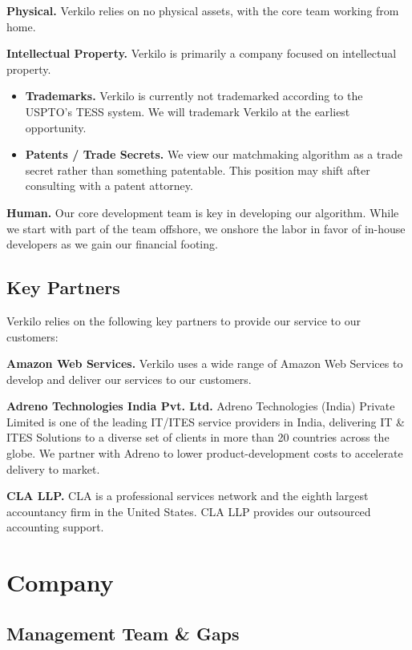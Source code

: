 \documentclass[11pt,openany]{book}
\providecommand{\tightlist}{%
  \setlength{\itemsep}{0pt}\setlength{\parskip}{0pt}}
\begin{document}
\textbf{Physical.} Verkilo relies on no physical assets, with the core
team working from home.

\textbf{Intellectual Property.} Verkilo is primarily a company focused
on intellectual property.

\begin{itemize}
\tightlist
\item
  \textbf{Trademarks.} Verkilo is currently not trademarked according to
  the USPTO's TESS system. We will trademark Verkilo at the earliest
  opportunity.
\item
  \textbf{Patents / Trade Secrets.} We view our matchmaking algorithm as
  a trade secret rather than something patentable. This position may
  shift after consulting with a patent attorney.
\end{itemize}

\textbf{Human.} Our core development team is key in developing our
algorithm. While we start with part of the team offshore, we onshore the
labor in favor of in-house developers as we gain our financial footing.

\hypertarget{key-partners}{%
\section{Key Partners}\label{key-partners}}

Verkilo relies on the following key partners to provide our service to
our customers:

\textbf{Amazon Web Services.} Verkilo uses a wide range of Amazon Web
Services to develop and deliver our services to our customers.

\textbf{Adreno Technologies India Pvt. Ltd.} Adreno Technologies (India)
Private Limited is one of the leading IT/ITES service providers in
India, delivering IT \& ITES Solutions to a diverse set of clients in
more than 20 countries across the globe. We partner with Adreno to lower
product-development costs to accelerate delivery to market.

\textbf{CLA LLP.} CLA is a professional services network and the eighth
largest accountancy firm in the United States. CLA LLP provides our
outsourced accounting support.

\hypertarget{company}{%
\chapter{Company}\label{company}}

\hypertarget{management-team-gaps}{%
\section{Management Team \& Gaps}\label{management-team-gaps}}
\end{document}

